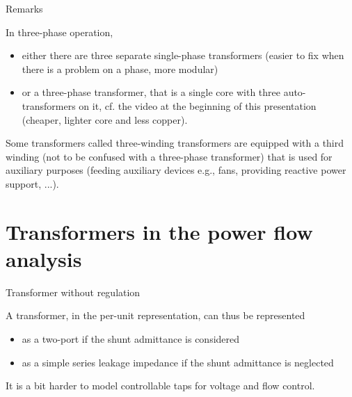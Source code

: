 \begin{frame}{Remarks}

In \alert{three-phase operation},
\begin{itemize}
\item either there are three separate single-phase transformers (easier to fix when there is a problem on a phase, more modular)
\item or a \alert{three-phase transformer}, that is a single core with three auto-transformers on it, cf. the video at the beginning of this presentation (cheaper, lighter core and less copper).
\end{itemize}
 
Some transformers called \alert{three-winding transformers} are equipped with a third winding (not to be confused with a three-phase transformer) that is used for auxiliary purposes (feeding auxiliary devices e.g., fans, providing reactive power support, ...).


\end{frame}

\section{Transformers in the power flow analysis}

\begin{frame}{Transformer without regulation}


A transformer, in the per-unit representation, can thus be represented 
\begin{itemize}
    \item as a two-port if the shunt admittance is considered
    \item as a simple series leakage impedance if the shunt admittance is neglected
\end{itemize}
 
It is a bit harder to model controllable taps for voltage and flow control.

\end{frame}

